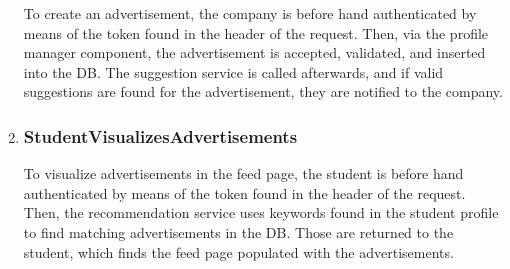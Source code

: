 \begin{enumerate}[label=\textbf{RV\arabic* -}]
To create an advertisement, the company is before hand authenticated by means of the token found in the header of the request.
Then, via the profile manager component, the advertisement is accepted, validated, and inserted into the DB.
The suggestion service is called afterwards, and if valid suggestions are found for the advertisement, they are notified to the company.

\begin{figure}[H]
    \centering
\end{figure}

\item \subsubsection{StudentVisualizesAdvertisements}

To visualize advertisements in the feed page, the student is before hand authenticated by means of the token found in the header of the request.
Then, the recommendation service uses keywords found in the student profile to find matching advertisements in the DB.
Those are returned to the student, which finds the feed page populated with the advertisements.

\begin{figure}[H]
    \centering
\end{figure}


\end{enumerate}
